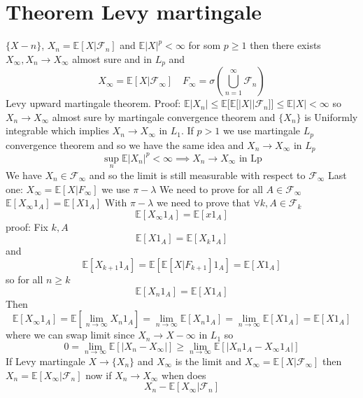 \documentclass[11pt]{article}
\begin{document}
\section{Theorem Levy martingale}
$\{X-n\}$,  $X_n = \mathbb{E}[X | \mathcal{F}_n]$ and $ \mathbb{E}|X|^{p} < \infty$ for som $p \ge 1$ then
there exists  $X_\infty, X_n \to X_\infty$ almost sure and in $L_p$ and
 \[
     X_\infty = \mathbb{E}[X| \mathcal{F}_\infty] \quad F_\infty = \sigma(\bigcup_{ n=1}^{\infty} \mathcal{F}_n)
\] 
Levy upward martingale theorem.
Proof: $ \mathbb{E}|X_n| \le \mathbb{E}[ \mathbb{E}[|X| | \mathcal{F}_n] ] \le \mathbb{E}|X| < \infty$
so $X_n \to X_\infty$ almost sure by martingale convergence theorem
and $\{X_n\}$ is Uniformly integrable which implies  $X_n \to X_\infty$ in $L_1$. If $p > 1$ we use martingale  $L_p$ convergence theorem and so we have the same idea and  $X_n \to X_\infty$ in $L_p$ 
\[
    \sup_n \mathbb{E}|X_n|^{p} < \infty \implies X_n \to X_\infty \text{ in Lp}
\] 
We have $X_n \in \mathcal{F}_\infty$ and so the limit is still measurable with respect to $ \mathcal{F}_\infty$
Last one: $X_\infty = \mathbb{E}[X | F_\infty]$ we use $\pi-\lambda$
We need to prove for all $A \in \mathcal{F}_\infty$ $ \mathbb{E}[X_\infty 1_A] = \mathbb{E}[X 1_A]$
With $\pi-\lambda$ we need to prove that $\forall k, A \in \mathcal{F}_k$
\[
    \mathbb{E}[X_\infty 1_A] = \mathbb{E}[x 1_A]
\] 
proof: Fix $k, A$
\[
    \mathbb{E}[X 1_A] = \mathbb{E}[X_k 1_A]
\] 
and
\[
    \mathbb{E}[X_{k+1} 1_A] = \mathbb{E}[ \mathbb{E}[X | F_{k+1}] 1_A] = \mathbb{E}[X 1_A]
\] 
so for all $n \ge k$
 \[
     \mathbb{E}[X_n 1_A] = \mathbb{E}[X 1_A]
\] 
Then
\[
    \mathbb{E}[X_\infty 1_A] = \mathbb{E}[ \lim_{n\to \infty} X_n 1_A] = \lim_{n\to \infty} \mathbb{E}[X_n 1_A] = \lim_{n\to \infty } \mathbb{E}[X 1_A] = \mathbb{E}[X 1_A]
\] 
where we can swap limit since $X_n \to X-\infty$ in $L_1$ so
\[
   0 = \lim_{n\to \infty} \mathbb{E}[|X_n - X_\infty|] \ge \lim_{n\to \infty}\mathbb{E}[|X_n 1_A - X_\infty 1_A|] 
\] 
If Levy martingale  $X \to \{X_n\}$ and  $X_\infty$ is the limit and $ X_\infty = \mathbb{E}[X | \mathcal{F}_\infty]$
then $X_n = \mathbb{E}[X_\infty | \mathcal{F}_n]$ now if $X_n \to X_\infty$ when does
\[
    X_n - \mathbb{E}[X_\infty | \mathcal{F}_n]
\] 
\end{document}
